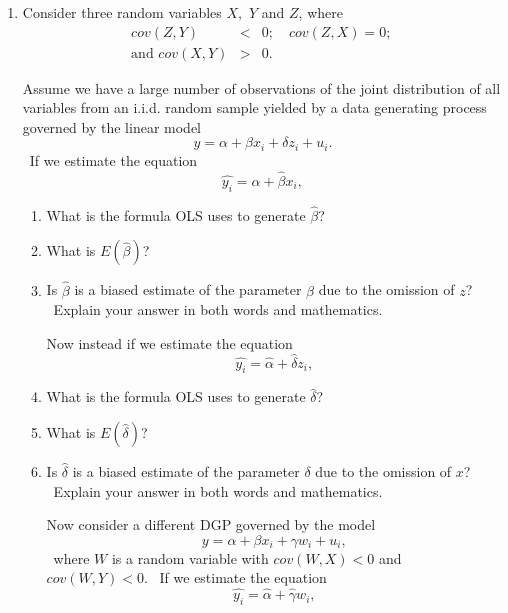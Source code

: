 \documentclass[11pt]{article}
\begin{document}
\begin{enumerate}
\item Consider three random variables $X,$ $Y$ and $Z$, where%
\begin{eqnarray*}
cov(Z,Y) &<&0;\quad cov(Z,X)=0\text{; } \\
\text{and }cov(X,Y) &>&0\text{.}
\end{eqnarray*}%
\smallskip 

Assume we have a large number of observations of the joint distribution of
all variables from an i.i.d. random sample yielded by a data generating
process governed by the linear model%
\begin{equation*}
y=\alpha +\beta x_{i}+\delta z_{i}+u_{i}.
\end{equation*}%
\smallskip \qquad\ If we estimate the equation 
\begin{equation*}
\widehat{y_{i}}=\widehat{\alpha }+\widehat{\beta }x_{i},
\end{equation*}

\begin{enumerate}
\item What is the formula OLS uses to generate $\widehat{\beta }$? $\ $

\item What is $E\left( \widehat{\beta }\right) $?

\item Is $\widehat{\beta }$ is a biased estimate of the parameter $\beta $
due to the omission of $z$? \ Explain your answer in both words and
mathematics.\bigskip \bigskip

Now instead if we estimate the equation 
\begin{equation*}
\widehat{y_{i}}=\widehat{\alpha }+\widehat{\delta }z_{i},
\end{equation*}

\item What is the formula OLS uses to generate $\widehat{\delta }$? $\ $

\item What is $E\left( \widehat{\delta }\right) $?

\item Is $\widehat{\delta }$ is a biased estimate of the parameter $\delta $
due to the omission of $x$? \ Explain your answer in both words and
mathematics.\newpage

Now consider a different DGP governed by the model%
\begin{equation*}
y=\alpha +\beta x_{i}+\gamma w_{i}+u_{i},
\end{equation*}%
\bigskip\ where $W$ is a random variable with $cov(W,X)<0$ and $cov(W,Y)<0.$
\ If we estimate the equation 
\begin{equation*}
\widehat{y_{i}}=\widehat{\alpha }+\widehat{\gamma }w_{i},
\end{equation*}


\end{enumerate}
\end{enumerate}
\end{document}
